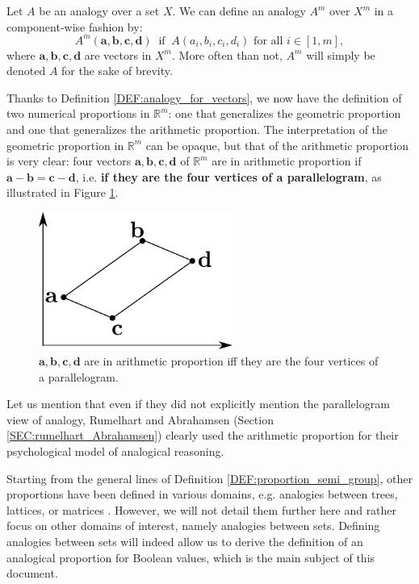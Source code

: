 \begin{definition}
  \label{DEF:analogy_for_vectors}
  Let $A$ be an analogy over a set $X$. We can define an analogy $A^m$ over
  $X^m$ in a component-wise fashion by:
  $$A^m(\mathbf{a}, \mathbf{b}, \mathbf{c}, \mathbf{d}) ~ \text{  if  } ~
  A(a_i, b_i, c_i, d_i) \text{ for all } i \in [1, m],$$
  where $\mathbf{a}, \mathbf{b}, \mathbf{c}, \mathbf{d}$ are vectors in $X^m$.
  More often than not, $A^m$ will simply be denoted $A$ for the sake of
  brevity.
\end{definition}
\noindent
Thanks to Definition \ref{DEF:analogy_for_vectors}, we now have the definition
of two numerical proportions in $\mathbb{R}^m$: one that generalizes the
geometric proportion and one that generalizes the arithmetic proportion.  The
interpretation of the geometric proportion in $\mathbb{R}^m$ can be opaque, but
that of the arithmetic proportion is very clear: four vectors $\mathbf{a},
\mathbf{b}, \mathbf{c}, \mathbf{d}$ of $\mathbb{R}^m$ are in arithmetic
proportion if $\mathbf{a} - \mathbf{b} = \mathbf{c} - \mathbf{d}$, i.e.
\textbf{if they are the four vertices of a parallelogram}, as illustrated in
Figure \ref{FIG:arithmetic_proportion}.
\begin{figure}[!h]
\centering
  \includegraphics[width=2.5in]{figures/arithmetic_proportion.pdf}
  \caption{$\mathbf{a}, \mathbf{b}, \mathbf{c}, \mathbf{d}$
  are in arithmetic proportion iff they are the four vertices of a
  parallelogram.}
\label{FIG:arithmetic_proportion}
\end{figure}

Let us mention that even if they did not explicitly mention the parallelogram
view of analogy, Rumelhart and Abrahamsen (Section
\ref{SEC:rumelhart_Abrahamsen}) clearly used the arithmetic proportion for
their psychological model of analogical reasoning.

Starting from the general lines of Definition \ref{DEF:proportion_semi_group},
other proportions have been defined in various domains, e.g. analogies
between trees, lattices, or matrices \cite{MicDel04, StrYvoREPORT05,
MicBayDelJAIR08}. However, we will not detail them further here and rather
focus on other domains of interest, namely analogies between sets. Defining
analogies between sets will indeed allow us to derive the definition of an
analogical proportion for Boolean values, which is the main subject of this
document.

